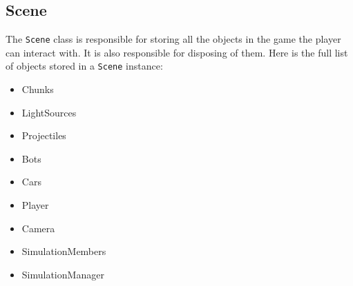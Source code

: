 \subsection{Scene}

The \texttt{Scene} class is responsible for storing all the objects in the game the player can interact with.
It is also responsible for disposing of them.
Here is the full list of objects stored in a \texttt{Scene} instance:

\begin{itemize}
    \item Chunks
    \item LightSources
    \item Projectiles
    \item Bots
    \item Cars
    \item Player
    \item Camera
    \item SimulationMembers
    \item SimulationManager
\end{itemize}


